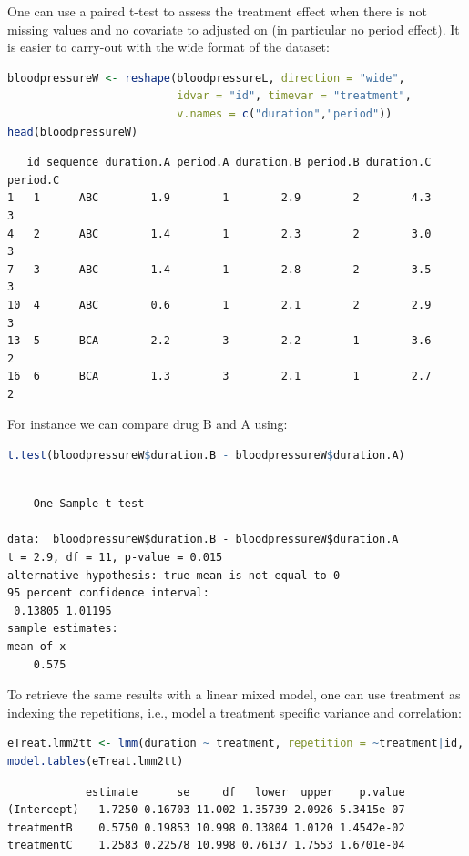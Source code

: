\documentclass[12pt]{article}
\begin{document}
One can use a paired t-test to assess the treatment effect when there
is not missing values and no covariate to adjusted on (in particular
no period effect). It is easier to carry-out with the wide format of
the dataset:
\begin{lstlisting}[language=r,numbers=none]
bloodpressureW <- reshape(bloodpressureL, direction = "wide",
                          idvar = "id", timevar = "treatment",
                          v.names = c("duration","period"))
head(bloodpressureW)
\end{lstlisting}

\label{}
\begin{verbatim}
   id sequence duration.A period.A duration.B period.B duration.C period.C
1   1      ABC        1.9        1        2.9        2        4.3        3
4   2      ABC        1.4        1        2.3        2        3.0        3
7   3      ABC        1.4        1        2.8        2        3.5        3
10  4      ABC        0.6        1        2.1        2        2.9        3
13  5      BCA        2.2        3        2.2        1        3.6        2
16  6      BCA        1.3        3        2.1        1        2.7        2
\end{verbatim}


For instance we can compare drug B and A using:
\begin{lstlisting}[language=r,numbers=none]
t.test(bloodpressureW$duration.B - bloodpressureW$duration.A)
\end{lstlisting}

\label{}
\begin{verbatim}

	One Sample t-test

data:  bloodpressureW$duration.B - bloodpressureW$duration.A
t = 2.9, df = 11, p-value = 0.015
alternative hypothesis: true mean is not equal to 0
95 percent confidence interval:
 0.13805 1.01195
sample estimates:
mean of x 
    0.575
\end{verbatim}

To retrieve the same results with a linear mixed model, one can use
treatment as indexing the repetitions, i.e., model a treatment
specific variance and correlation:
\begin{lstlisting}[language=r,numbers=none]
eTreat.lmm2tt <- lmm(duration ~ treatment, repetition = ~treatment|id, data = bloodpressureL)
model.tables(eTreat.lmm2tt)
\end{lstlisting}

\label{}
\begin{verbatim}
            estimate      se     df   lower  upper    p.value
(Intercept)   1.7250 0.16703 11.002 1.35739 2.0926 5.3415e-07
treatmentB    0.5750 0.19853 10.998 0.13804 1.0120 1.4542e-02
treatmentC    1.2583 0.22578 10.998 0.76137 1.7553 1.6701e-04
\end{verbatim}
\end{document}
